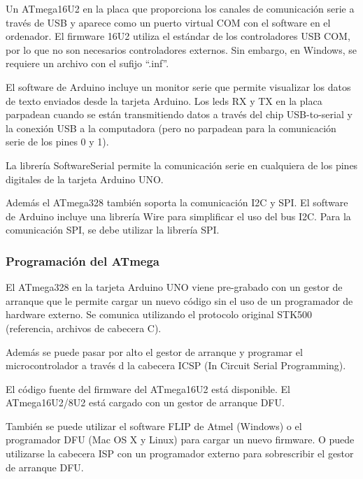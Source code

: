 Un ATmega16U2 en la placa que proporciona los canales de comunicación serie a través de USB y aparece como un puerto virtual COM con el software en el ordenador. El firmware 16U2 utiliza el estándar de los controladores USB COM, por lo que no son necesarios controladores externos. Sin embargo, en Windows, se requiere un archivo con el sufijo “.inf”. 



El software de Arduino incluye un monitor serie que permite visualizar los datos de texto enviados desde la tarjeta Arduino. Los leds RX y TX en la placa parpadean cuando se están transmitiendo datos a través del chip USB-to-serial y la conexión USB a la computadora (pero no parpadean para la comunicación serie de los pines 0 y 1).



La librería SoftwareSerial permite la comunicación serie en cualquiera de los pines digitales de la tarjeta Arduino UNO.



Además el ATmega328 también soporta la comunicación I2C y SPI. El software de Arduino incluye una librería Wire para simplificar el uso del bus I2C. Para la comunicación SPI, se debe utilizar la librería SPI.



\subsubsection{Programación del ATmega}
El ATmega328 en la tarjeta Arduino UNO viene pre-grabado con un gestor de arranque que le permite cargar un nuevo código sin el uso de un programador de hardware externo. Se comunica utilizando el protocolo original STK500 (referencia, archivos de cabecera C).



Además se puede pasar por alto el gestor de arranque y programar el microcontrolador a través d la cabecera ICSP (In Circuit Serial Programming).



El código fuente del firmware del ATmega16U2 está disponible. El ATmega16U2/8U2 está cargado con un gestor de arranque DFU.



También se puede utilizar el software FLIP de Atmel (Windows) o el programador DFU (Mac OS X y Linux) para cargar un nuevo firmware. O puede utilizarse la cabecera ISP con un programador externo para sobrescribir el gestor de arranque DFU.




